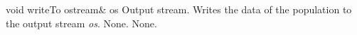 \vspace*{4ex}

\setConstInstance
\printMethodWithOneParam
{void}
{writeTo}
{ostream\&}
{os}
{Output stream.}
{Writes the data of the population to the output stream {\em os}.}
{None.}
{None.}






